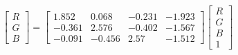 \begin{equation}
\begin{bmatrix}
  R \\ G \\ B 
\end{bmatrix}=
\left[\begin{matrix}1.852 & 0.068 & -0.231 & -1.923\\ 
-0.361 & 2.576 & -0.402 & -1.567\\ 
-0.091 & -0.456 & 2.57 & -1.512\end{matrix}\right]
\begin{bmatrix}
  R \\ G \\ B \\ 1 
\end{bmatrix}
\end{equation}
